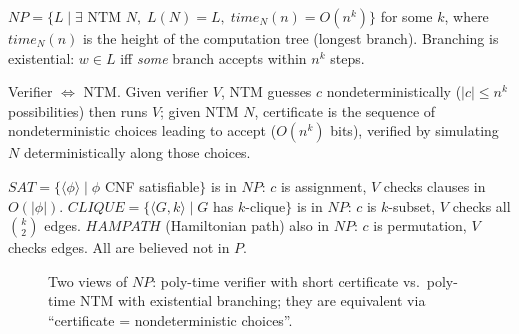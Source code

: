 \begin{definition}
$NP=\{L\mid\exists\text{ NTM }N,\;L(N)=L,\;time_N(n)=O(n^k)\}$ for some $k$, where $time_N(n)$ is the height of the computation tree (longest branch). Branching is existential: $w\in L$ iff \emph{some} branch accepts within $n^k$ steps.
\end{definition}

\begin{theorem}
Verifier $\iff$ NTM. Given verifier $V$, NTM guesses $c$ nondeterministically ($|c|\le n^k$ possibilities) then runs $V$; given NTM $N$, certificate is the sequence of nondeterministic choices leading to accept ($O(n^k)$ bits), verified by simulating $N$ deterministically along those choices.
\end{theorem}

\begin{example}[$NP$ examples]
$SAT=\{\langle\phi\rangle\mid\phi$ CNF satisfiable$\}$ is in $NP$: $c$ is assignment, $V$ checks clauses in $O(|\phi|)$. $CLIQUE=\{\langle G,k\rangle\mid G$ has $k$-clique$\}$ is in $NP$: $c$ is $k$-subset, $V$ checks all $\binom{k}{2}$ edges. $HAMPATH$ (Hamiltonian path) also in $NP$: $c$ is permutation, $V$ checks edges. All are believed not in $P$.
\end{example}

\begin{figure}[h]
\centering
{}
\caption{Two views of $NP$: poly-time verifier with short certificate vs.\ poly-time NTM with existential branching; they are equivalent via ``certificate = nondeterministic choices''.}
\label{fig:NP-views}
\end{figure}

